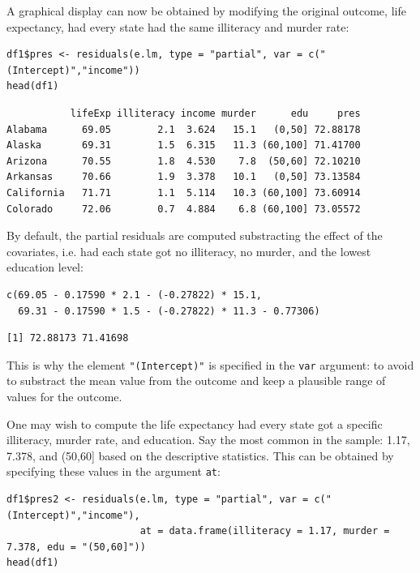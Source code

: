 \documentclass[12pt]{article}
\begin{document}
A graphical display can now be obtained by modifying the original
outcome, life expectancy, had every state had the same illiteracy and
murder rate:
\lstset{language=r,label= ,caption= ,captionpos=b,numbers=none}
\begin{lstlisting}
df1$pres <- residuals(e.lm, type = "partial", var = c("(Intercept)","income"))
head(df1)
\end{lstlisting}

\begin{verbatim}
           lifeExp illiteracy income murder      edu     pres
Alabama      69.05        2.1  3.624   15.1   (0,50] 72.88178
Alaska       69.31        1.5  6.315   11.3 (60,100] 71.41700
Arizona      70.55        1.8  4.530    7.8  (50,60] 72.10210
Arkansas     70.66        1.9  3.378   10.1   (0,50] 73.13584
California   71.71        1.1  5.114   10.3 (60,100] 73.60914
Colorado     72.06        0.7  4.884    6.8 (60,100] 73.05572
\end{verbatim}


By default, the partial residuals are computed substracting the effect
of the covariates, i.e. had each state got no illiteracy, no murder,
and the lowest education level:
\lstset{language=r,label= ,caption= ,captionpos=b,numbers=none}
\begin{lstlisting}
c(69.05 - 0.17590 * 2.1 - (-0.27822) * 15.1,
  69.31 - 0.17590 * 1.5 - (-0.27822) * 11.3 - 0.77306)
\end{lstlisting}

\begin{verbatim}
[1] 72.88173 71.41698
\end{verbatim}


This is why the element \texttt{"(Intercept)"} is specified in the \texttt{var}
argument: to avoid to substract the mean value from the outcome and
keep a plausible range of values for the outcome.

\bigskip

One may wish to compute the life expectancy had every state got a
specific illiteracy, murder rate, and education. Say the most common
in the sample: 1.17, 7.378, and (50,60] based on the descriptive
statistics. This can be obtained by specifying these values in the
argument \texttt{at}:
\lstset{language=r,label= ,caption= ,captionpos=b,numbers=none}
\begin{lstlisting}
df1$pres2 <- residuals(e.lm, type = "partial", var = c("(Intercept)","income"),
                       at = data.frame(illiteracy = 1.17, murder = 7.378, edu = "(50,60]"))
head(df1)
\end{lstlisting}
\end{document}
